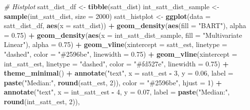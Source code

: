 \documentclass[
  12pt,
]{article}
\newenvironment{Shaded}{\begin{snugshade}}{\end{snugshade}}
\newcommand{\AttributeTok}[1]{\textcolor[rgb]{0.13,0.29,0.53}{#1}}
\newcommand{\CommentTok}[1]{\textcolor[rgb]{0.56,0.35,0.01}{\textit{#1}}}
\newcommand{\DecValTok}[1]{\textcolor[rgb]{0.00,0.00,0.81}{#1}}
\newcommand{\FloatTok}[1]{\textcolor[rgb]{0.00,0.00,0.81}{#1}}
\newcommand{\FunctionTok}[1]{\textcolor[rgb]{0.13,0.29,0.53}{\textbf{#1}}}
\newcommand{\NormalTok}[1]{#1}
\newcommand{\OtherTok}[1]{\textcolor[rgb]{0.56,0.35,0.01}{#1}}
\newcommand{\SpecialCharTok}[1]{\textcolor[rgb]{0.81,0.36,0.00}{\textbf{#1}}}
\newcommand{\StringTok}[1]{\textcolor[rgb]{0.31,0.60,0.02}{#1}}
\begin{document}
\begin{Shaded}
\begin{Highlighting}[]
\CommentTok{\# Histplot}
\NormalTok{satt\_dist\_df }\OtherTok{\textless{}{-}} \FunctionTok{tibble}\NormalTok{(satt\_dist)}
\NormalTok{int\_satt\_dist\_sample }\OtherTok{\textless{}{-}} \FunctionTok{sample}\NormalTok{(int\_satt\_dist, }\AttributeTok{size =} \DecValTok{2000}\NormalTok{)}
\NormalTok{satt\_histplot }\OtherTok{\textless{}{-}} \FunctionTok{ggplot}\NormalTok{(}\AttributeTok{data =}\NormalTok{ satt\_dist\_df, }\FunctionTok{aes}\NormalTok{(}\AttributeTok{x =}\NormalTok{ satt\_dist)) }\SpecialCharTok{+} 
  \FunctionTok{geom\_density}\NormalTok{(}\FunctionTok{aes}\NormalTok{(}\AttributeTok{fill =} \StringTok{"BART"}\NormalTok{), }\AttributeTok{alpha =} \FloatTok{0.75}\NormalTok{) }\SpecialCharTok{+} 
  \FunctionTok{geom\_density}\NormalTok{(}\FunctionTok{aes}\NormalTok{(}\AttributeTok{x =}\NormalTok{ int\_satt\_dist\_sample, }\AttributeTok{fill =} \StringTok{"Multivariate Linear"}\NormalTok{), }
               \AttributeTok{alpha =} \FloatTok{0.75}\NormalTok{) }\SpecialCharTok{+} 
  \FunctionTok{geom\_vline}\NormalTok{(}\AttributeTok{xintercept =}\NormalTok{ satt\_est, }\AttributeTok{linetype =} \StringTok{"dashed"}\NormalTok{, }
             \AttributeTok{color =} \StringTok{"\#2596be"}\NormalTok{, }\AttributeTok{linewidth =} \FloatTok{0.75}\NormalTok{) }\SpecialCharTok{+}
  \FunctionTok{geom\_vline}\NormalTok{(}\AttributeTok{xintercept =}\NormalTok{ int\_satt\_est, }\AttributeTok{linetype =} \StringTok{"dashed"}\NormalTok{, }
             \AttributeTok{color =} \StringTok{"\#fd527e"}\NormalTok{, }\AttributeTok{linewidth =} \FloatTok{0.75}\NormalTok{) }\SpecialCharTok{+}
  \FunctionTok{theme\_minimal}\NormalTok{() }\SpecialCharTok{+} 
  \FunctionTok{annotate}\NormalTok{(}\StringTok{"text"}\NormalTok{, }
           \AttributeTok{x =}\NormalTok{ satt\_est }\SpecialCharTok{{-}} \DecValTok{3}\NormalTok{, }
           \AttributeTok{y =} \FloatTok{0.06}\NormalTok{, }
           \AttributeTok{label =} \FunctionTok{paste}\NormalTok{(}\StringTok{"Median:"}\NormalTok{, }\FunctionTok{round}\NormalTok{(satt\_est, }\DecValTok{2}\NormalTok{)), }
           \AttributeTok{color =} \StringTok{"\#2596be"}\NormalTok{,}
           \AttributeTok{hjust =} \DecValTok{1}\NormalTok{) }\SpecialCharTok{+}
  \FunctionTok{annotate}\NormalTok{(}\StringTok{"text"}\NormalTok{, }
           \AttributeTok{x =}\NormalTok{ int\_satt\_est }\SpecialCharTok{{-}} \DecValTok{4}\NormalTok{, }
           \AttributeTok{y =} \FloatTok{0.07}\NormalTok{, }
           \AttributeTok{label =} \FunctionTok{paste}\NormalTok{(}\StringTok{"Median:"}\NormalTok{, }\FunctionTok{round}\NormalTok{(int\_satt\_est, }\DecValTok{2}\NormalTok{)), }

\end{Highlighting}
\end{Shaded}
\end{document}
